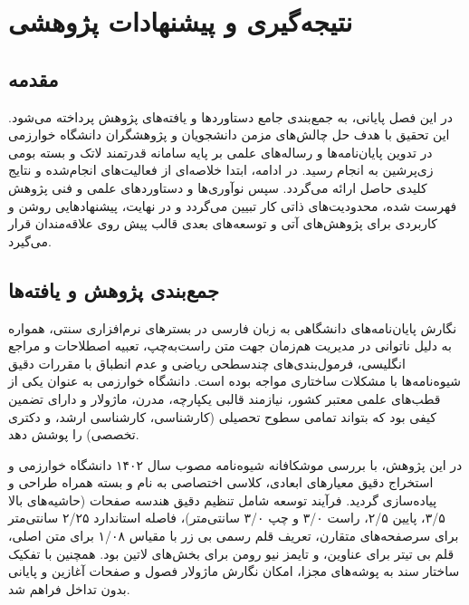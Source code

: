 
\chapter{نتیجه‌گیری و پیشنهادات پژوهشی}
\label{chap:conclusion}

\section{مقدمه}
\label{sec:ch5_intro}

در این فصل پایانی، به جمع‌بندی جامع دستاوردها و یافته‌های پژوهش پرداخته می‌شود. این تحقیق با هدف حل چالش‌های مزمن دانشجویان و پژوهشگران دانشگاه خوارزمی در تدوین پایان‌نامه‌ها و رساله‌های علمی بر پایه سامانه قدرتمند لاتک و بسته بومی زی‌پرشین به انجام رسید. در ادامه، ابتدا خلاصه‌ای از فعالیت‌های انجام‌شده و نتایج کلیدی حاصل ارائه می‌گردد. سپس نوآوری‌ها و دستاوردهای علمی و فنی پژوهش فهرست شده، محدودیت‌های ذاتی کار تبیین می‌گردد و در نهایت، پیشنهادهایی روشن و کاربردی برای پژوهش‌های آتی و توسعه‌های بعدی قالب پیش روی علاقه‌مندان قرار می‌گیرد.

\section{جمع‌بندی پژوهش و یافته‌ها}
\label{sec:ch5_summary}

نگارش پایان‌نامه‌های دانشگاهی به زبان فارسی در بسترهای نرم‌افزاری سنتی، همواره به دلیل ناتوانی در مدیریت هم‌زمان جهت متن راست‌به‌چپ، تعبیه اصطلاحات و مراجع انگلیسی، فرمول‌بندی‌های چندسطحی ریاضی و عدم انطباق با مقررات دقیق شیوه‌نامه‌ها با مشکلات ساختاری مواجه بوده است. دانشگاه خوارزمی به عنوان یکی از قطب‌های علمی معتبر کشور، نیازمند قالبی یکپارچه، مدرن، ماژولار و دارای تضمین کیفی بود که بتواند تمامی سطوح تحصیلی (کارشناسی، کارشناسی ارشد، و دکتری تخصصی) را پوشش دهد.

در این پژوهش، با بررسی موشکافانه شیوه‌نامه مصوب سال ۱۴۰۲ دانشگاه خوارزمی و استخراج دقیق معیارهای ابعادی، کلاسی اختصاصی به نام  و بسته همراه  طراحی و پیاده‌سازی گردید. فرآیند توسعه شامل تنظیم دقیق هندسه صفحات (حاشیه‌های بالا ۳/۵، پایین ۲/۵، راست ۳/۰ و چپ ۳/۰ سانتی‌متر)، فاصله استاندارد ۲/۲۵ سانتی‌متر برای سرصفحه‌های متقارن، تعریف قلم رسمی بی زر با مقیاس ۱/۰۸ برای متن اصلی، قلم بی تیتر برای عناوین، و تایمز نیو رومن برای بخش‌های لاتین بود. همچنین با تفکیک ساختار سند به پوشه‌های مجزا، امکان نگارش ماژولار فصول و صفحات آغازین و پایانی بدون تداخل فراهم شد.

